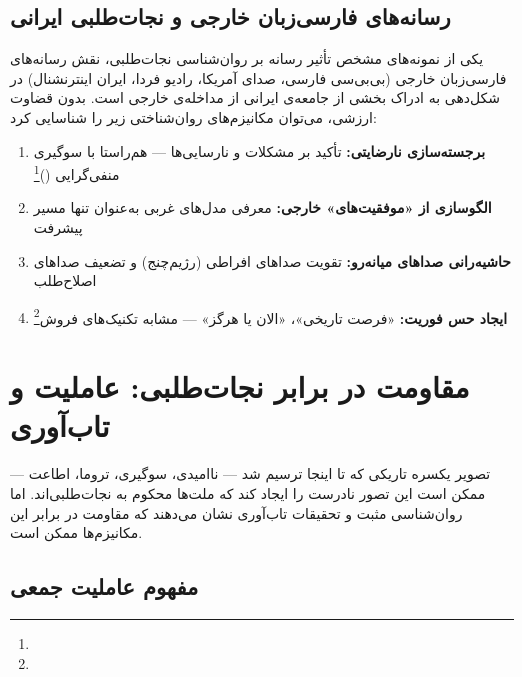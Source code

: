 \subsection{رسانه‌های فارسی‌زبان خارجی و نجات‌طلبی ایرانی}
\label{subsec:ch11-persian-media}

یکی از نمونه‌های مشخص تأثیر رسانه بر روان‌شناسی نجات‌طلبی، نقش رسانه‌های فارسی‌زبان خارجی (بی‌بی‌سی فارسی، صدای آمریکا، رادیو فردا، ایران اینترنشنال) در شکل‌دهی به ادراک بخشی از جامعه‌ی ایرانی از مداخله‌ی خارجی است. بدون قضاوت ارزشی، می‌توان مکانیزم‌های روان‌شناختی زیر را شناسایی کرد:

\begin{enumerate}
\item \textbf{برجسته‌سازی نارضایتی:} تأکید بر مشکلات و نارسایی‌ها — هم‌راستا با سوگیری منفی‌گرایی ()\footnote{}
\item \textbf{الگوسازی از «موفقیت‌های» خارجی:} معرفی مدل‌های غربی به‌عنوان تنها مسیر پیشرفت
\item \textbf{حاشیه‌رانی صداهای میانه‌رو:} تقویت صداهای افراطی (رژیم‌چنج) و تضعیف صداهای اصلاح‌طلب
\item \textbf{ایجاد حس فوریت:} «فرصت تاریخی»، «الان یا هرگز» — مشابه تکنیک‌های فروش\footnote{}
\end{enumerate}


\section{مقاومت در برابر نجات‌طلبی: عاملیت و تاب‌آوری}
\label{sec:ch11-resilience}

تصویر یکسره تاریکی که تا اینجا ترسیم شد — ناامیدی، سوگیری، تروما، اطاعت — ممکن است این تصور نادرست را ایجاد کند که ملت‌ها محکوم به نجات‌طلبی‌اند. اما روان‌شناسی مثبت و تحقیقات تاب‌آوری نشان می‌دهند که مقاومت در برابر این مکانیزم‌ها ممکن است.

\subsection{مفهوم عاملیت جمعی}
\label{subsec:ch11-agency}

